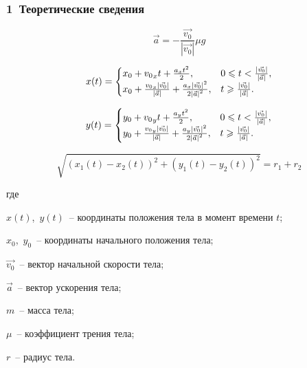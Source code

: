\documentclass[xetex,aspectratio=43]{beamer}
\newenvironment{Underequation}{
    \small
    \noindent
    где
    \hspace{-1.45ex}
    \setlength{\parindent}{3.5ex}
}{}
\begin{document}
\begin{frame}
    \frametitle{1~Теоретические сведения}

    \begin{equation}\label{acceleration123}
        \vec{a} = -\frac{\vec{v_0}}{\left|\vec{v_0}\right|} \mu g
    \end{equation}

    \begin{equation}\label{r_x_1}
        x(t) =
        \begin{cases}
            x_0 + {v_0}_x t + \frac{a_x t^2}{2},                                                                                               & 0 \leqslant t < \frac{\left|\vec{v_0}\right|}{\left|\vec{a}\right|}, \\
            x_0 + \frac{{v_0}_x \left|\vec{v_0}\right|}{\left|\vec{a}\right|} + \frac{a_x \left|\vec{v_0}\right|^2}{2 \left|\vec{a}\right|^2}, & t \geqslant \frac{\left|\vec{v_0}\right|}{\left|\vec{a}\right|}.
        \end{cases}
    \end{equation}

    \begin{equation}\label{r_y_1}
        y(t) =
        \begin{cases}
            y_0 + {v_0}_y t + \frac{a_y t^2}{2},                                                                                               & 0 \leqslant t < \frac{\left|\vec{v_0}\right|}{\left|\vec{a}\right|}, \\
            y_0 + \frac{{v_0}_y \left|\vec{v_0}\right|}{\left|\vec{a}\right|} + \frac{a_y \left|\vec{v_0}\right|^2}{2 \left|\vec{a}\right|^2}, & t \geqslant \frac{\left|\vec{v_0}\right|}{\left|\vec{a}\right|}.
        \end{cases}
    \end{equation}

    \begin{equation}\label{bodybodyoft}
        \sqrt{(x_1(t) - x_2(t))^2 + (y_1(t) - y_2(t))^2} = r_1 + r_2
    \end{equation}

    \begin{Underequation}
        \(x(t)\),~\(y(t)\)~-- координаты положения тела в момент времени \(t\);

        \(x_0\),~\(y_0\)~-- координаты начального положения тела;

        \(\vec{v_0}\)~-- вектор начальной скорости тела;

        \(\vec{a}\)~-- вектор ускорения тела;

        \(m\)~-- масса тела;

        \(\mu\)~-- коэффициент трения тела;

        \(r\)~-- радиус тела.
    \end{Underequation}
\end{frame}
\end{document}

